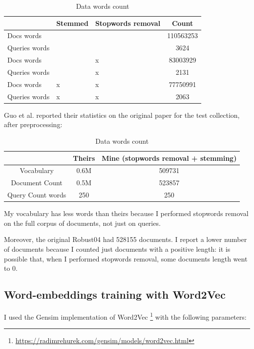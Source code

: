 \begin{table}[H]
\centering
\begin{tabular}{p{2cm}p{2cm}p{2cm}c}
 & Stemmed & Stopwords removal & Count \\ \hline
Docs words & & & 110563253 \\ \hline
Queries words & & & 3624 \\ \hline
Docs words & & x & 83003929 \\ \hline
Queries words & & x & 2131 \\ \hline
Docs words & x & x & 77750991 \\ \hline
Queries words & x & x & 2063 \\ \hline
\end{tabular}
\caption{Data words count}
\end{table}

Guo et al. reported their statistics on the original paper for the test collection, after preprocessing:

\begin{table}[H]
\centering
\begin{tabular}{ccc}
 & Theirs & Mine (stopwords removal + stemming) \\ \hline
Vocabulary & 0.6M & 509731 \\
Document Count & 0.5M & 523857 \\
Query Count words & 250 & 250 \\ \hline
\end{tabular}
\caption{Data words count}
\end{table}

My vocabulary has less words than theirs because I performed stopwords removal on the full corpus of documents, not just on queries.

Moreover, the original Robust04 \cite{rob04} had 528155 documents. I report a lower number of documents because I counted just documents with a positive length: it is possible that, when I performed stopwords removal, some documents length went to 0.

\subsection{Word-embeddings training with Word2Vec}
\label{ssec:wemb}

I used the Gensim implementation of Word2Vec \footnote{\url{https://radimrehurek.com/gensim/models/word2vec.html}} with the following parameters:

